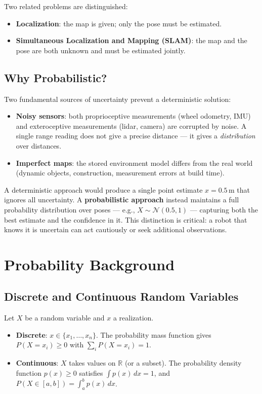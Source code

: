 \documentclass[11pt,a4paper]{article}
\theoremstyle{definition}
\theoremstyle{plain}
\theoremstyle{remark}
\begin{document}
Two related problems are distinguished:
\begin{itemize}
    \item \textbf{Localization}: the map is given; only the pose must be estimated.
    \item \textbf{Simultaneous Localization and Mapping (SLAM)}: the map and the pose are both unknown and must be estimated jointly.
\end{itemize}

\subsection{Why Probabilistic?}

Two fundamental sources of uncertainty prevent a deterministic solution:
\begin{itemize}
    \item \textbf{Noisy sensors}: both proprioceptive measurements (wheel odometry, IMU) and exteroceptive measurements (lidar, camera) are corrupted by noise. A single range reading does not give a precise distance — it gives a \textit{distribution} over distances.
    \item \textbf{Imperfect maps}: the stored environment model differs from the real world (dynamic objects, construction, measurement errors at build time).
\end{itemize}

A deterministic approach would produce a single point estimate $x = 0.5\,\text{m}$ that ignores all uncertainty. A \textbf{probabilistic approach} instead maintains a full probability distribution over poses — e.g., $X \sim \mathcal{N}(0.5, 1)$ — capturing both the best estimate and the confidence in it. This distinction is critical: a robot that knows it is uncertain can act cautiously or seek additional observations.

\section{Probability Background}

\subsection{Discrete and Continuous Random Variables}

Let $X$ be a random variable and $x$ a realization.

\begin{itemize}
    \item \textbf{Discrete}: $x \in \{x_1, \ldots, x_n\}$. The probability mass function gives $P(X = x_i) \geq 0$ with $\sum_i P(X = x_i) = 1$.
    \item \textbf{Continuous}: $X$ takes values on $\mathbb{R}$ (or a subset). The probability density function $p(x) \geq 0$ satisfies $\int p(x)\,dx = 1$, and $P(X \in [a,b]) = \int_a^b p(x)\,dx$.
\end{itemize}
\end{document}
